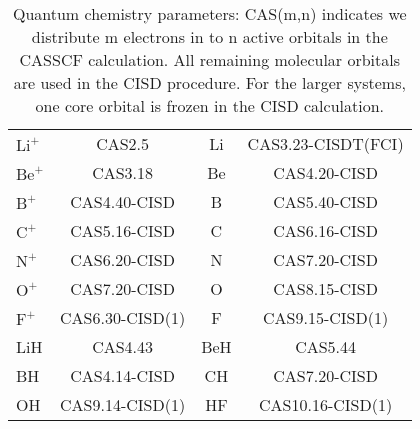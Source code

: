 \begin{table}[h]
\caption{Quantum chemistry parameters: CAS(m,n) indicates we distribute m electrons in to n active orbitals in the CASSCF calculation. All remaining molecular orbitals are used in the CISD procedure. For the larger systems, one core orbital is frozen in the CISD calculation.\label{tab:CAS}}
\begin{tabular}{lc|cc} \hline\hline
$\text{Li}^+$ & CAS2.5 & Li & CAS3.23-CISDT(FCI) \\ 
$\text{Be}^+$ & CAS3.18 & Be & CAS4.20-CISD \\ 
$\text{B}^+$ & CAS4.40-CISD & B & CAS5.40-CISD \\
$\text{C}^+$ & CAS5.16-CISD & C & CAS6.16-CISD \\
$\text{N}^+$ & CAS6.20-CISD & N & CAS7.20-CISD \\
$\text{O}^+$ & CAS7.20-CISD & O & CAS8.15-CISD \\
$\text{F}^+$ & CAS6.30-CISD(1) & F & CAS9.15-CISD(1) \\ \hline
LiH & CAS4.43 & BeH & CAS5.44 \\ 
BH & CAS4.14-CISD & CH & CAS7.20-CISD \\ 
OH & CAS9.14-CISD(1) & HF & CAS10.16-CISD(1) \\ \hline \hline
\end{tabular}
\end{table}